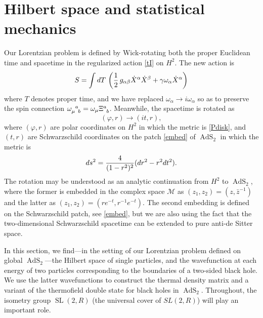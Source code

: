 \documentclass[11pt]{article}
\newcommand{\be}{\begin{equation}}
\newcommand{\ee}{\end{equation}}
\newcommand{\lt}{\left}
\newcommand{\rt}{\right}
\newcommand{\vp}{\varphi}
\newcommand{\calM}{\mathcal{M}}
\newcommand{\RR}{\mathbb{R}}
\DeclareMathOperator{\SL}{SL}
\DeclareMathOperator{\tSL}{\widetilde{\mathrm{SL}}}
\DeclareMathOperator{\tAdS}{\widetilde{AdS}}
\DeclareMathOperator{\HH}{H}
\newcommand{\al}{\alpha}
\newcommand{\bt}{\beta}
\newcommand{\om}{\omega}
\newcommand{\ga}{\gamma}
\newcommand{\ov}{\over}
\def\widetilde#1{#1}%
\def\HH{H}
\def\SL{SL}
\def\RR{R}
\begin{document}
\section{Hilbert space and statistical mechanics}

Our Lorentzian problem is defined by Wick-rotating both the proper Euclidean time and spacetime in the regularized action \eqref{tI} on $\HH^2$. The new action is 
\be \label{LorS}
S=\int dT\, \lt( {1 \ov 2}\,g_{\al\bt}\dot{X}^{\al}\dot{X}^{\bt}+ \ga \om_{\al}\dot{X}^{\al}\rt)
\ee
where $T$ denotes proper time,  and we have replaced $\omega_{\al}\to i\omega_{\al}$ so as to preserve the spin connection $\tensor{\omega}{_\mu^a_b}=\omega_{\mu}\tensor{\Xi}{^a_b}$. Meanwhile, the spacetime is rotated as
\be \label{dgcont}
(\vp,r) \to (it,r),
\ee
where $(\vp,r)$ are polar coordinates on $\HH^2$ in which the metric is \eqref{Pdisk}, and $(t,r)$ are Schwarzschild coordinates on the patch \eqref{embed} of $\tAdS_2$ in which the metric is
\be \label{Smetric}
 ds^2={4 \ov (1-r^2)^2}(dr^2-r^2 dt^2).
\ee
The rotation may be understood as an analytic continuation from $\HH^2$ to $\tAdS_2$, where the former is embedded in the complex space $\calM$ as $(z_1, z_2)=(z, \bar{z}^{-1})$ and the latter as $(z_1,z_2)=(re^{-t},r^{-1}e^{-t})$. The second embedding is defined on the Schwarzschild patch, see \eqref{embed}, but we are also using the fact that the two-dimensional Schwarzschild spacetime can be extended to pure anti-de Sitter space.

In this section, we find---in the setting of our Lorentzian problem defined on global $\tAdS_2$---the Hilbert space of single particles, and the wavefunction at each energy of two particles corresponding to the boundaries of a two-sided black hole. We use the latter wavefunctions to construct the thermal density matrix and a variant of the thermofield double state for black holes in $\tAdS_2$. Throughout, the isometry group $\tSL(2,\RR)$ (the universal cover of $\SL(2,\RR)$) will play an important role.
\end{document}
